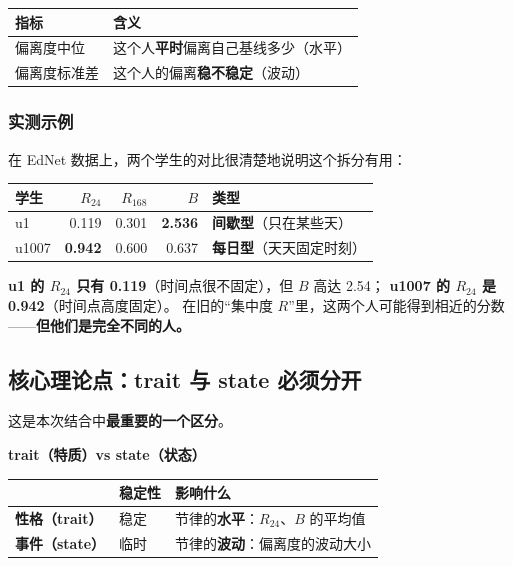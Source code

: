 \documentclass[UTF8,a4paper,11pt]{ctexart}
\newenvironment{explainbox}[1]
{\begin{center}\begin{minipage}{0.94\textwidth}\colorbox{boxbg}{\parbox{0.92\textwidth}{\textbf{#1}\par\vspace{2pt}}}}
{\end{minipage}\end{center}}
\begin{document}
\begin{longtable}{@{}p{3.4cm}p{10.4cm}@{}}
\toprule
\textbf{指标} & \textbf{含义} \\
\midrule
偏离度中位 & 这个人\textbf{平时}偏离自己基线多少（水平） \\
偏离度标准差 & 这个人的偏离\textbf{稳不稳定}（波动） \\
\bottomrule
\end{longtable}

\subsubsection{实测示例}

在 EdNet 数据上，两个学生的对比很清楚地说明这个拆分有用：

\begin{center}
\begin{tabular}{lrrrl}
\toprule
\textbf{学生} & $R_{24}$ & $R_{168}$ & $B$ & \textbf{类型} \\
\midrule
u1 & 0.119 & 0.301 & \textbf{2.536} & \textbf{间歇型}（只在某些天） \\
u1007 & \textbf{0.942} & 0.600 & 0.637 & \textbf{每日型}（天天固定时刻） \\
\bottomrule
\end{tabular}
\end{center}

\textbf{u1 的 $R_{24}$ 只有 0.119}（时间点很不固定），但 $B$ 高达 2.54；
\textbf{u1007 的 $R_{24}$ 是 0.942}（时间点高度固定）。
在旧的“集中度 $R$”里，这两个人可能得到相近的分数——\textbf{但他们是完全不同的人。}

\subsection{核心理论点：trait 与 state 必须分开}

这是本次结合中\textbf{最重要的一个区分}。

\begin{explainbox}{trait（特质）vs state（状态）}
\begin{center}
\begin{tabular}{p{2.6cm}p{3.4cm}p{7.4cm}}
\toprule
 & \textbf{稳定性} & \textbf{影响什么} \\
\midrule
\textbf{性格（trait）} & 稳定 & 节律的\textbf{水平}：$R_{24}$、$B$ 的平均值 \\
\textbf{事件（state）} & 临时 & 节律的\textbf{波动}：偏离度的波动大小 \\
\bottomrule
\end{tabular}
\end{center}
\end{explainbox}
\end{document}
